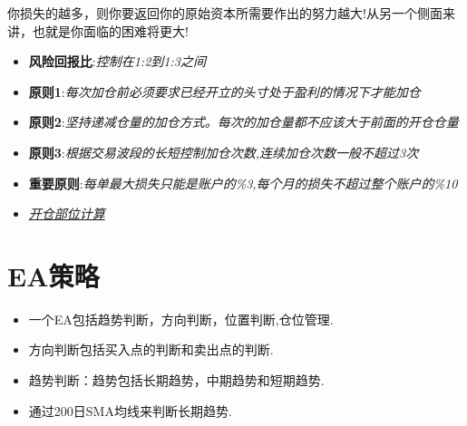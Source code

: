 你损失的越多，则你要返回你的原始资本所需要作出的努力越大!从另一个侧面来讲，也就是你面临的困难将更大!

\begin{itemize}
\item \textbf{风险回报比}:\textit{控制在1:2到1:3之间}
\item \textbf{原则1}:\textit{每次加仓前必须要求已经开立的头寸处于盈利的情况下才能加仓}
\item \textbf{原则2}:\textit{坚持递减仓量的加仓方式。每次的加仓量都不应该大于前面的开仓仓量}
\item \textbf{原则3}:\textit{根据交易波段的长短控制加仓次数,连续加仓次数一般不超过3次}
\item \textbf{重要原则}:\textit{每单最大损失只能是账户的\%3,每个月的损失不超过整个账户的\%10}
\item \href{run:Risk Position Size Calculation.xlsx}{\textit{开仓部位计算}} 
\end{itemize}


\section{EA策略}
\begin{itemize}
\item 一个EA包括趋势判断，方向判断，位置判断,仓位管理.
\item 方向判断包括买入点的判断和卖出点的判断.
\item 趋势判断：趋势包括长期趋势，中期趋势和短期趋势.
\item 通过200日SMA均线来判断长期趋势.





\end{itemize}






